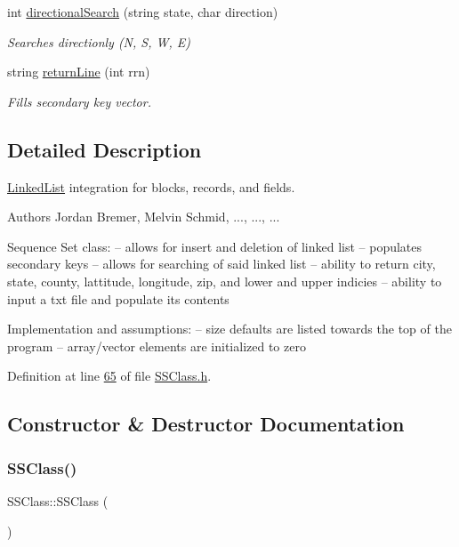 \begin{DoxyCompactItemize}
int \hyperlink{classSSClass_ad03c99840c2946a2112f5f1942c287f2}{directional\+Search} (string state, char direction)
\begin{DoxyCompactList}\small\item\em Searches directionly (N, S, W, E) \end{DoxyCompactList}\item 
string \hyperlink{classSSClass_ab0a8ea1af895df28359b5733bd920ef3}{return\+Line} (int rrn)
\begin{DoxyCompactList}\small\item\em Fills secondary key vector. \end{DoxyCompactList}\end{DoxyCompactItemize}


\subsection{Detailed Description}
\hyperlink{classLinkedList}{Linked\+List} integration for blocks, records, and fields. 

\begin{DoxyAuthor}{Authors}
Jordan Bremer, Melvin Schmid, ..., ..., ...
\end{DoxyAuthor}
Sequence Set class\+: -- allows for insert and deletion of linked list -- populates secondary keys -- allows for searching of said linked list -- ability to return city, state, county, lattitude, longitude, zip, and lower and upper indicies -- ability to input a txt file and populate it\textquotesingle{}s contents

Implementation and assumptions\+: -- size defaults are listed towards the top of the program -- array/vector elements are initialized to zero 

Definition at line \hyperlink{SSClass_8h_source_l00065}{65} of file \hyperlink{SSClass_8h_source}{S\+S\+Class.\+h}.



\subsection{Constructor \& Destructor Documentation}
\mbox{\label{classSSClass_ab4603d6a236c4fa65f896a1158c0d2ef}} 
\subsubsection{\texorpdfstring{S\+S\+Class()}{SSClass()}\hspace{0.1cm}{\footnotesize\ttfamily [1/2]}}
{\footnotesize\ttfamily S\+S\+Class\+::\+S\+S\+Class (\begin{DoxyParamCaption}{ }\end{DoxyParamCaption})}



